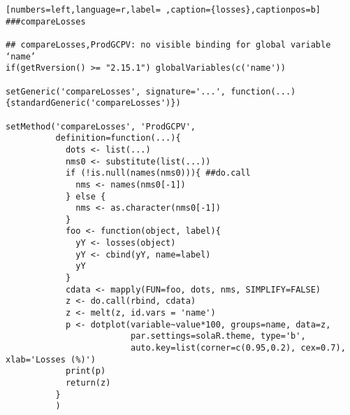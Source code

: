 \begin{lstlisting}[numbers=left,language=r,label= ,caption={losses},captionpos=b]
###compareLosses

## compareLosses,ProdGCPV: no visible binding for global variable ‘name’
if(getRversion() >= "2.15.1") globalVariables(c('name'))

setGeneric('compareLosses', signature='...', function(...){standardGeneric('compareLosses')})

setMethod('compareLosses', 'ProdGCPV',
          definition=function(...){
            dots <- list(...)
            nms0 <- substitute(list(...))
            if (!is.null(names(nms0))){ ##do.call
              nms <- names(nms0[-1])
            } else {
              nms <- as.character(nms0[-1])
            }
            foo <- function(object, label){
              yY <- losses(object)
              yY <- cbind(yY, name=label)
              yY
            }
            cdata <- mapply(FUN=foo, dots, nms, SIMPLIFY=FALSE)
            z <- do.call(rbind, cdata)
            z <- melt(z, id.vars = 'name')
            p <- dotplot(variable~value*100, groups=name, data=z,
                         par.settings=solaR.theme, type='b',
                         auto.key=list(corner=c(0.95,0.2), cex=0.7), xlab='Losses (%)')
            print(p)
            return(z)
          }
          )
\end{lstlisting}
